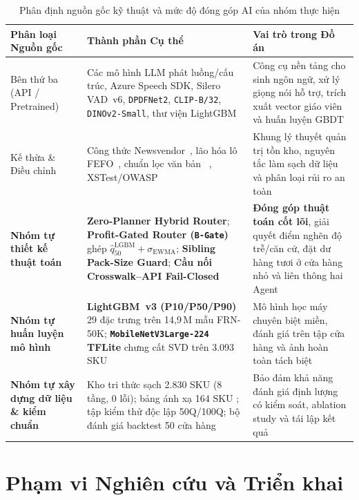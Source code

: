 \begin{table}[H]
\centering
\caption{Phân định nguồn gốc kỹ thuật và mức độ đóng góp AI của nhóm thực hiện}
\label{tab:contribution_matrix}
\footnotesize
\begin{tabularx}{\textwidth}{L{3.1cm} L{4.7cm} Y}
\toprule
\textbf{Phân loại Nguồn gốc} & \textbf{Thành phần Cụ thể} & \textbf{Vai trò trong Đồ án} \\
\midrule
Bên thứ ba (API / Pretrained) & Các mô hình LLM phát luồng/cấu trúc, Azure Speech SDK, Silero VAD~v6, \texttt{DPDFNet2}, \texttt{CLIP-B/32}, \texttt{DINOv2-Small}, thư viện LightGBM & Công cụ nền tảng cho sinh ngôn ngữ, xử lý giọng nói hỗ trợ, trích xuất vector giáo viên và huấn luyện GBDT \\
Kế thừa \& Điều chỉnh & Công thức Newsvendor~\cite{silver2017inventory}, lão hóa lô FEFO~\cite{nahmias2011perishable}, chuẩn lọc văn bản ~\cite{hf_datatrove}, XSTest/OWASP & Khung lý thuyết quản trị tồn kho, nguyên tắc làm sạch dữ liệu và phân loại rủi ro an toàn \\
\textbf{Nhóm tự thiết kế thuật toán} & \textbf{Zero-Planner Hybrid Router}; \textbf{Profit-Gated Router (\texttt{B-Gate})} ghép $\hat{q}_{50}^{\text{LGBM}} + \sigma_{\text{EWMA}}$; \textbf{Sibling Pack-Size Guard}; \textbf{Cầu nối Crosswalk--API Fail-Closed} & \textbf{Đóng góp thuật toán cốt lõi}, giải quyết điểm nghẽn độ trễ/căn cứ, đặt dư hàng tươi ở cửa hàng nhỏ và liên thông hai Agent \\
\textbf{Nhóm tự huấn luyện mô hình} & \textbf{LightGBM~v3 (P10/P50/P90)} 29 đặc trưng trên 14,9\,M mẫu FRN-50K; \textbf{\texttt{MobileNetV3Large-224} TFLite} chưng cất SVD trên 3.093 SKU & Mô hình học máy chuyên biệt miền, đánh giá trên tập cửa hàng và ảnh hoàn toàn tách biệt \\
\textbf{Nhóm tự xây dựng dữ liệu \& kiểm chuẩn} & Kho tri thức sạch 2.830 SKU (8 tầng, 0 lỗi); bảng ánh xạ 164 SKU ; tập kiểm thử độc lập 50Q/100Q; bộ đánh giá backtest 50 cửa hàng & Bảo đảm khả năng đánh giá định lượng có kiểm soát, ablation study và tái lập kết quả \\
\bottomrule
\end{tabularx}
\end{table}

\section{Phạm vi Nghiên cứu và Triển khai}

